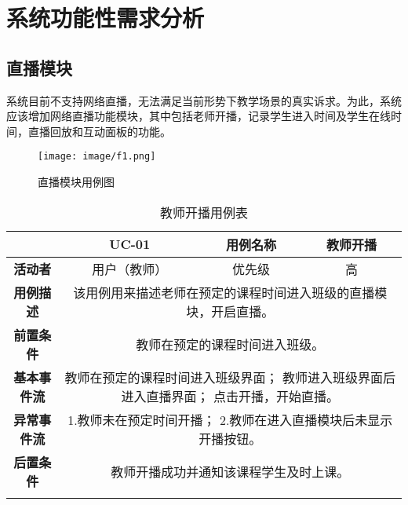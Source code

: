 \section{系统功能性需求分析}
\subsection{直播模块}

 系统目前不支持网络直播，无法满足当前形势下教学场景的真实诉求。为此，系统应该增加网络直播功能模块，其中包括老师开播，记录学生进入时间及学生在线时间，直播回放和互动面板的功能。

\begin{figure}[!htb]
	\centering\label{fig:fig1}
	\texttt{[image: image/f1.png]}
	\caption{直播模块用例图}
\end{figure}



\begin{longtable}[c]{c|ccc}
	\caption{教师开播用例表}
	\label{tab:tab1}\\
	\shline
	\multicolumn{1}{c|}{\textbf{用例编号}} & \multicolumn{1}{c|}{UC-01} & \multicolumn{1}{c|}{用例名称} &  教师开播\\ \hline
	\endhead
	\multicolumn{1}{c|}{\textbf{活动者}} & \multicolumn{1}{c|}{用户（教师）} & \multicolumn{1}{c|}{优先级} &高  \\ \hline
	\textbf{用例描述} & \multicolumn{3}{p{12cm}}{该用例用来描述老师在预定的课程时间进入班级的直播模块，开启直播。} \\ \hline
	\textbf{前置条件}& \multicolumn{3}{p{12cm}}{教师在预定的课程时间进入班级。} \\ \hline
	\textbf{基本事件流}& \multicolumn{3}{p{12cm}}{教师在预定的课程时间进入班级界面；\newline
	    教师进入班级界面后进入直播界面；\newline
	    点击开播，开始直播。
	} \\ \hline
	\textbf{异常事件流}& \multicolumn{3}{p{12cm}}{1.教师未在预定时间开播；\newline
	2.教师在进入直播模块后未显示开播按钮。
	} \\ \hline
	\textbf{后置条件}& \multicolumn{3}{p{12cm}}{教师开播成功并通知该课程学生及时上课。} \\ \shline
\end{longtable}

